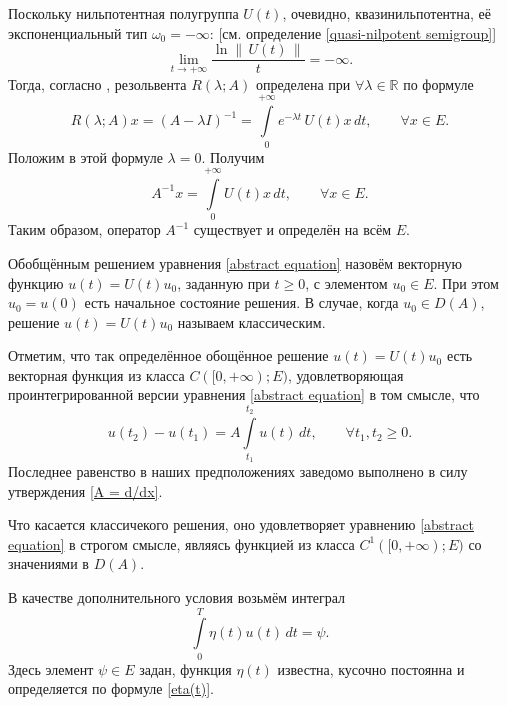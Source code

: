 \documentclass{article}
\renewcommand{\ge}{\geqslant}
\theoremstyle{definition}
\begin{document}
Поскольку нильпотентная полугруппа $U(t)$, очевидно, квазинильпотентна, её экспоненциальный тип $\omega_0 = -\infty$:
[см. определение \ref{quasi-nilpotent semigroup}]
\begin{equation*}
	\lim\limits_{t \rightarrow +\infty} \frac{\ln \|\, U(t) \, \|}{t} = -\infty.
\end{equation*}
Тогда, согласно \cite[теорема VIII.1.11]{Dunford_Schwartz}, резольвента $R(\lambda; A)$ определена при 
$\forall \lambda \in \mathbb{R}$ по формуле
\begin{equation*}
	R(\lambda; A)x = (A -\lambda I)^{-1} = \int\limits_{0}^{+\infty}e^{-\lambda t}\,U(t)x\,dt, \qquad \forall x \in E.
\end{equation*}
Положим в этой формуле $\lambda = 0$. Получим
\begin{equation*}
	A^{-1}x = \int\limits_{0}^{+\infty}U(t)x\,dt, \qquad \forall x \in E.
\end{equation*}
Таким образом, оператор $A^{-1}$ существует и определён на всём $E$.

Обобщённым решением уравнения \eqref{abstract equation} назовём векторную функцию \linebreak 
$ u(t) = U(t)u_0 $, заданную при $ t \ge 0 $, с элементом $ u_0 \in E $. 
При этом $ u_0 = u(0) $ есть начальное состояние решения. 
В случае, когда $ u_0 \in D(A) $, решение $ u(t) = U(t)u_0 $ называем классическим.

Отметим, что так определённое обощённое решение $u(t) = U(t)u_0$ есть векторная функция из класса 
$C([0, +\infty); E)$, удовлетворяющая проинтегрированной версии уравнения \eqref{abstract equation} в том смысле, что
\begin{equation*}
	u(t_2) - u(t_1) = A\int\limits_{t_1}^{t_2} u(t) \,dt, \qquad \forall t_1, t_2 \ge 0.
\end{equation*}
Последнее равенство в наших предположениях заведомо выполнено в силу утверждения \ref{A = d/dx}.

Что касается классичекого решения, оно удовлетворяет уравнению \eqref{abstract equation} в строгом смысле,
являясь функцией из класса $C^1([0, +\infty); E)$ со значениями в $D(A)$.

В качестве дополнительного условия возьмём интеграл
\begin{equation} \label{abstarct integral}
	\int\limits_{0}^{T} \eta(t)u(t)\,dt = \psi.
\end{equation}
Здесь элемент $ \psi \in E $ задан, функция $ \eta(t) $ известна, кусочно постоянна и определяется по формуле \eqref{eta(t)}.
\end{document}

